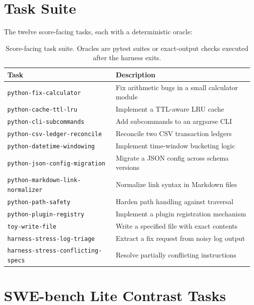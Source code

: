 \documentclass[11pt]{article}
\begin{document}



\appendix

\section{Task Suite}
\label{app:tasks}

The twelve score-facing tasks, each with a deterministic oracle:

\begin{table}[h]
\centering
\small
\begin{tabular}{l l}
\toprule
Task & Description \\
\midrule
\texttt{python-fix-calculator} & Fix arithmetic bugs in a small calculator module \\
\texttt{python-cache-ttl-lru} & Implement a TTL-aware LRU cache \\
\texttt{python-cli-subcommands} & Add subcommands to an argparse CLI \\
\texttt{python-csv-ledger-reconcile} & Reconcile two CSV transaction ledgers \\
\texttt{python-datetime-windowing} & Implement time-window bucketing logic \\
\texttt{python-json-config-migration} & Migrate a JSON config across schema versions \\
\texttt{python-markdown-link-normalizer} & Normalize link syntax in Markdown files \\
\texttt{python-path-safety} & Harden path handling against traversal \\
\texttt{python-plugin-registry} & Implement a plugin registration mechanism \\
\texttt{toy-write-file} & Write a specified file with exact contents \\
\texttt{harness-stress-log-triage} & Extract a fix request from noisy log output \\
\texttt{harness-stress-conflicting-specs} & Resolve partially conflicting instructions \\
\bottomrule
\end{tabular}
\caption{Score-facing task suite. Oracles are pytest suites or exact-output checks executed after the harness exits.}
\label{tab:tasks}
\end{table}

\section{SWE-bench Lite Contrast Tasks}
\label{app:swetasks}
\end{document}
